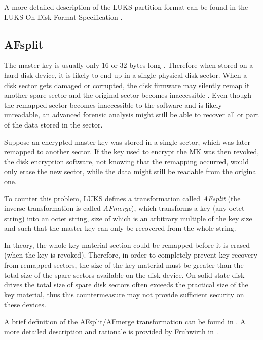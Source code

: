 \documentclass[12pt,oneside]{fithesis2}
\begin{document}
      A more detailed description of the LUKS partition format can be found in the LUKS On-Disk Format Specification \cite[section 2.4]{luks}.
      
      \subsection{AFsplit}
      The master key is usually only 16 or 32 bytes long \cite[chapter 1]{luks}. Therefore when stored on a hard disk device, it is likely to end up in a single physical disk sector. When a disk sector gets damaged or corrupted, the disk firmware may silently remap it another spare sector and the original sector becomes inaccessible \cite[chapter 1]{luks}. Even though the remapped sector becomes inaccessible to the software and is likely unreadable, an advanced forensic analysis might still be able to recover all or part of the data stored in the sector.
      
      Suppose an encrypted master key was stored in a single sector, which was later remapped to another sector. If the key used to encrypt the MK was then revoked, the disk encryption software, not knowing that the remapping occurred, would only erase the new sector, while the data might still be readable from the original one.
      
      To counter this problem, LUKS defines a transformation called \emph{AFsplit} (the inverse transformation is called \emph{AFmerge}), which transforms a key (any octet string) into an octet string, size of which is an arbitrary multiple of the key size and such that the master key can only be recovered from the whole string.
      
      In theory, the whole key material section could be remapped before it is erased (when the key is revoked). Therefore, in order to completely prevent key recovery from remapped sectors, the size of the key material must be greater than the total size of the spare sectors available on the disk device. On solid-state disk drives the total size of spare disk sectors often exceeds the practical size of the key material, thus this countermeasure may not provide sufficient security on these devices.
      
      A brief definition of the AFsplit/AFmerge transformation can be found in \cite[section 2.4]{luks}. A more detailed description and rationale is provided by Fruhwirth in \cite[section 5.2]{Fruhwirth}.
      
\end{document}
